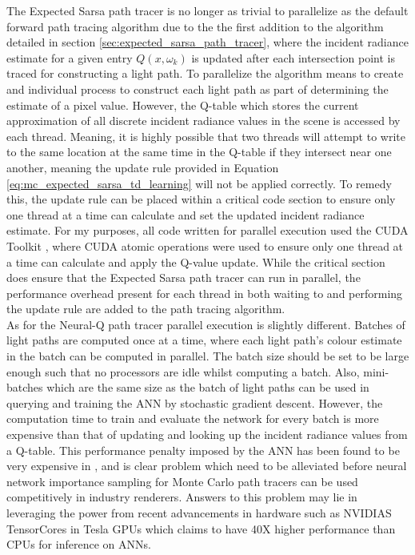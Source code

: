 \documentclass[../dissertation.tex]{subfiles}
\begin{document}
The Expected Sarsa path tracer is no longer as trivial to parallelize as the default forward path tracing algorithm due to the the first addition to the algorithm detailed in section \ref{sec:expected_sarsa_path_tracer}, where the incident radiance estimate for a given entry $Q(x,\omega_k)$ is updated after each intersection point is traced for constructing a light path. To parallelize the algorithm means to create and individual process to construct each light path as part of determining the estimate of a pixel value. However, the Q-table which stores the current approximation of all discrete incident radiance values in the scene is accessed by each thread. Meaning, it is highly possible that two threads will attempt to write to the same location at the same time in the Q-table if they intersect near one another, meaning the update rule provided in Equation \ref{eq:mc_expected_sarsa_td_learning} will not be applied correctly. To remedy this, the update rule can be placed within a critical code section \cite{raynal2012concurrent} to ensure only one thread at a time can calculate and set the updated incident radiance estimate. For my purposes, all code written for parallel execution used the CUDA Toolkit \cite{cuda}, where CUDA atomic operations were used to ensure only one thread at a time can calculate and apply the Q-value update. While the critical section does ensure that the Expected Sarsa path tracer can run in parallel, the performance overhead present for each thread in both waiting to and performing the update rule are added to the path tracing algorithm.\\

As for the Neural-Q path tracer parallel execution is slightly different. Batches of light paths are computed once at a time, where each light path's colour estimate in the batch can be computed in parallel. The batch size should be set to be large enough such that no processors are idle whilst computing a batch. Also, mini-batches which are the same size as the batch of light paths can be used in querying and training the ANN by stochastic gradient descent. However, the computation time to train and evaluate the network for every batch is more expensive than that of updating and looking up the incident radiance values from a Q-table. This performance penalty imposed by the ANN has been found to be very expensive in \cite{keller2019integral, muller2018neural}, and is clear problem which need to be alleviated before neural network importance sampling for Monte Carlo path tracers can be used competitively in industry renderers. Answers to this problem may lie in leveraging the power from recent advancements in hardware such as NVIDIAS TensorCores in Tesla GPUs \cite{tensor_cores} which claims to have 40X higher performance than CPUs for inference on ANNs.
\end{document}
